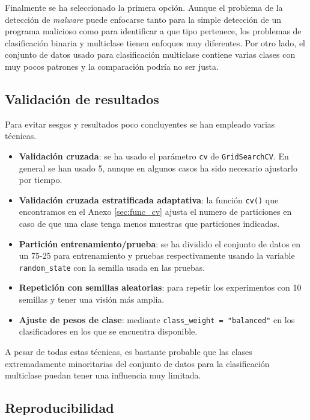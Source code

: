 \vspace{1em}

Finalmente se ha seleccionado la primera opción. Aunque el problema de la detección de \textit{malware} puede enfocarse tanto para la simple detección de un programa malicioso como para identificar a que tipo pertenece, los problemas de clasificación binaria y multiclase tienen enfoques muy diferentes. Por otro lado, el conjunto de datos usado para clasificación multiclase contiene varias clases con muy pocos patrones y la comparación podría no ser justa.

\newpage
\subsection{Validación de resultados}
\label{subsec:validaction}

Para evitar sesgos y resultados poco concluyentes se han empleado varias técnicas.

\begin{itemize}
	\item \textbf{Validación cruzada}: se ha usado el parámetro \texttt{cv} de \texttt{GridSearchCV}. En general se han usado 5, aunque en algunos casos ha sido necesario ajustarlo por tiempo.
	\item \textbf{Validación cruzada estratificada adaptativa}: la función \texttt{cv()} que encontramos en el Anexo \ref{sec:func_cv} ajusta el numero de particiones en caso de que una clase tenga menos muestras que particiones indicadas.
	\item \textbf{Partición entrenamiento/prueba}: se ha dividido el conjunto de datos en un 75-25 para entrenamiento y pruebas respectivamente usando la variable \texttt{random\_state} con la semilla usada en las pruebas.
	\item \textbf{Repetición con semillas aleatorias}: para repetir los experimentos con 10 semillas y tener una visión más amplia.
	\item \textbf{Ajuste de pesos de clase}: mediante \texttt{class\_weight = "balanced"} en los clasificadores en los que se encuentra disponible.
\end{itemize}

A pesar de todas estas técnicas, es bastante probable que las clases extremadamente minoritarias del conjunto de datos para la clasificación multiclase puedan tener una influencia muy limitada.

\newpage
\subsection{Reproducibilidad}
\label{subsec:reproducibilidad}

